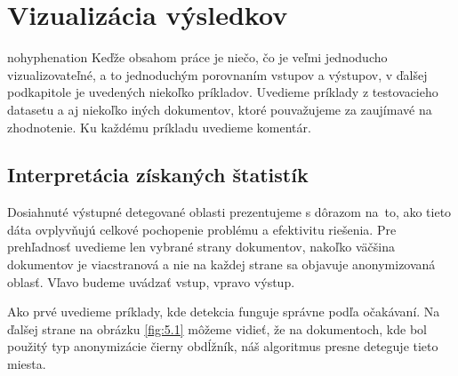 \chapter{Vizualizácia výsledkov}
\label{chap:FifthChapter}
\begin{hyphenrules}{nohyphenation}
Keďže obsahom práce je niečo, čo je veľmi jednoducho vizualizovateľné, a to jednoduchým porovnaním vstupov a výstupov, v ďalšej podkapitole je uvedených niekoľko príkladov. Uvedieme príklady z testovacieho datasetu a aj niekoľko iných dokumentov, ktoré pouvažujeme za zaujímavé na zhodnotenie. Ku každému príkladu uvedieme komentár.
\section{Interpretácia získaných štatistík}
Dosiahnuté výstupné detegované oblasti prezentujeme s dôrazom na~to, ako tieto dáta ovplyvňujú celkové pochopenie problému a efektivitu riešenia. Pre prehľadnosť uvedieme len vybrané strany dokumentov, nakoľko väčšina dokumentov je viacstranová a nie na každej strane sa objavuje anonymizovaná oblasť. Vľavo budeme uvádzať vstup, vpravo výstup.
\newline 

Ako prvé uvedieme príklady, kde detekcia funguje správne podľa očakávaní. Na ďalšej strane na obrázku \ref{fig:5.1} môžeme vidieť, že na dokumentoch, kde bol použitý typ anonymizácie čierny obdĺžník, náš algoritmus presne deteguje tieto miesta.


\end{hyphenrules}
